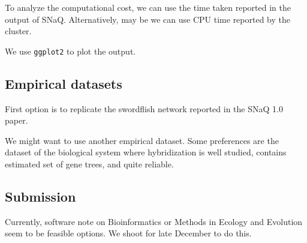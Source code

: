 \documentclass{article}
\begin{document}
To analyze the computational cost, we can use the time taken reported in the output of SNaQ. Alternatively, may be we can use CPU time reported by the cluster.

We use \texttt{ggplot2} to plot the output.

\subsection{Empirical datasets}
First option is to replicate the swordflish network reported in the SNaQ 1.0 paper.

We might want to use another empirical dataset. Some preferences are the dataset of the biological system where hybridization is well studied, contains estimated set of gene trees, and quite reliable.

\subsection{Submission}
Currently, software note on Bioinformatics or Methods in Ecology and Evolution seem to be feasible options. We shoot for late December to do this.
\end{document}
